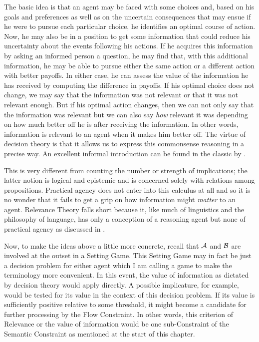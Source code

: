 The basic idea is that an agent may be faced with some choices and, based on his goals and preferences as well as on the uncertain consequences that may ensue if he were to pursue each particular choice, he identifies an optimal course of action. Now, he may also be in a position to get some information that could reduce his uncertainty about the events following his actions. If he acquires this information by asking an informed person a question, he may find that, with this additional information, he may be able to pursue either the same action or a different action with better payoffs. In either case, he can assess the value of the information he has received by computing the difference in payoffs. If his optimal choice does not change, we may say that the information was not relevant or that it was not relevant enough. But if his optimal action changes, then we can not only say that the information was relevant but we can also say \emph{how} relevant it was depending on how much better off he is after receiving the information. In other words, information is relevant to an agent when it makes him better off. The virtue of decision theory is that it allows us to express this commonsense reasoning in a precise way. An excellent informal introduction can be found in the classic by \citet{raiffa:da}.


This is very different from counting the number or strength of implications; the latter notion is logical and epistemic and is concerned solely with relations among propositions. Practical agency does not enter into this calculus at all and so it is no wonder that it fails to get a grip on how information might \emph{matter} to an agent. Relevance Theory falls short because it, like much of linguistics and the philosophy of language, has only a conception of a reasoning agent but none of practical agency as discussed in .

Now, to make the ideas above a little more concrete, recall that $\cal A$ and $\cal B$ are involved at the outset in a Setting Game. This Setting Game may in fact be just a decision problem for either agent which I am calling a game to make the terminology more convenient. In this event, the value of information as dictated by decision theory would apply directly. A possible implicature, for example, would be tested for its value in the context of this decision problem. If its value is sufficiently positive relative to some threshold, it might become a candidate for further processing by the Flow Constraint. In other words, this criterion of Relevance or the value of information would be one sub-Constraint of the Semantic Constraint as mentioned at the start of this chapter.

